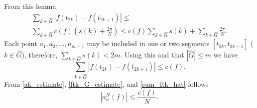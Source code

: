 From this lemma  
\begin{multline*}
\sum_{k \in \hat{G}} \left| f(t_{2k}) - f(t_{2k+1}) \right| \leq \\
\sum_{k \in \hat{G}} c(f) \left(s(k) + \frac{2\pi}{N}\right) \leq 
c(f) \sum_{k \in \hat{G}} s(k) + \sum_{k \in \hat{G}}\frac{2\pi}{N}.
\end{multline*}
Each point $a_1,a_2,\ldots, a_{m-1}$ may be included in one or two segments $[t_{2k}, t_{2k+1}]$ 
($k \in \hat{G}$), therefore, $\sum_{k \in \hat{G}} s(k) < 2m$. Using this and that $|\hat{G}| \leq m$ we have
\begin{equation} \label{sum_ftk_hat}
\sum_{k \in \hat{G}} \left| f(t_{2k}) - f(t_{2k+1}) \right| \leq c(f).
\end{equation}
From \eqref{ak_estimate}, \eqref{ftk_G_estimate}, and \eqref{sum_ftk_hat} follows
\begin{equation}\label{an_estimate}
\left|a_{n}^{N}(f)\right| \leq \frac{c(f)}{N}.
\end{equation}
